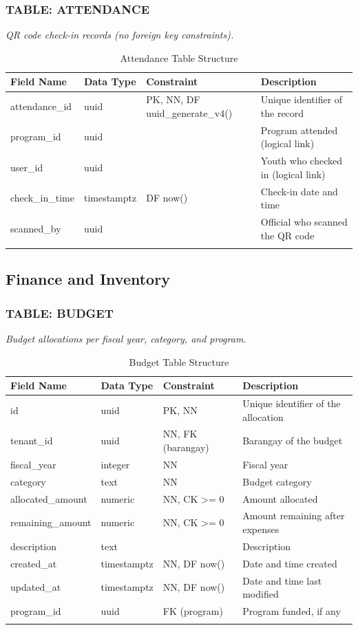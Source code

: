 \subsubsection*{TABLE: ATTENDANCE}
\noindent\textit{QR code check-in records (no foreign key constraints).}
\begin{longtable}{|p{3.2cm}|p{2.2cm}|p{3.2cm}|p{5.4cm}|}
\hline
\textbf{Field Name} & \textbf{Data Type} & \textbf{Constraint} & \textbf{Description} \\ \hline
\endhead
\hline \endfoot
\hline \endlastfoot
attendance\_id & uuid & PK, NN, DF uuid\_generate\_v4() & Unique identifier of the record \\ \hline
program\_id & uuid & & Program attended (logical link) \\ \hline
user\_id & uuid & & Youth who checked in (logical link) \\ \hline
check\_in\_time & timestamptz & DF now() & Check-in date and time \\ \hline
scanned\_by & uuid & & Official who scanned the QR code \\ \hline
\caption{Attendance Table Structure}
\label{tab:attendance}
\end{longtable}

\subsection{Finance and Inventory}

\subsubsection*{TABLE: BUDGET}
\noindent\textit{Budget allocations per fiscal year, category, and program.}
\begin{longtable}{|p{3.2cm}|p{2.2cm}|p{3.2cm}|p{5.4cm}|}
\hline
\textbf{Field Name} & \textbf{Data Type} & \textbf{Constraint} & \textbf{Description} \\ \hline
\endhead
\hline \endfoot
\hline \endlastfoot
id & uuid & PK, NN & Unique identifier of the allocation \\ \hline
tenant\_id & uuid & NN, FK (barangay) & Barangay of the budget \\ \hline
fiscal\_year & integer & NN & Fiscal year \\ \hline
category & text & NN & Budget category \\ \hline
allocated\_amount & numeric & NN, CK >= 0 & Amount allocated \\ \hline
remaining\_amount & numeric & NN, CK >= 0 & Amount remaining after expenses \\ \hline
description & text & & Description \\ \hline
created\_at & timestamptz & NN, DF now() & Date and time created \\ \hline
updated\_at & timestamptz & NN, DF now() & Date and time last modified \\ \hline
program\_id & uuid & FK (program) & Program funded, if any \\ \hline
\caption{Budget Table Structure}
\label{tab:budget}
\end{longtable}
\vspace{3mm}

